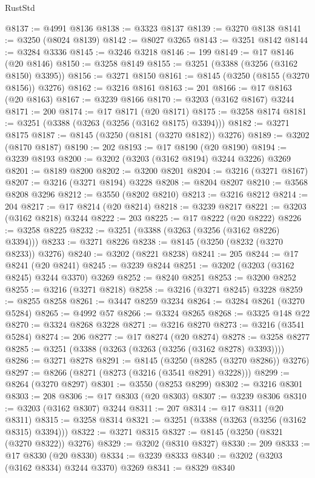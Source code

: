 \begin{lexlean}{RustStd}
\begin{coremodule}
@8137 := @4991 @8136
@8138 := @3323 @8137
@8139 := @3270 @8138
@8141 := @3250 (@8024 @8139)
@8142 := @8027 @3265
@8143 := @3251 @8142
@8144 := @3284 @3336
@8145 := @3246 @3218
@8146 := 199
@8149 := @17 @8146 (@20 @8146)
@8150 := @3258 @8149
@8155 := @3251 (@3388 (@3256 (@3162 @8150) @3395))
@8156 := @3271 @8150
@8161 := @8145 (@3250 (@8155 (@3270 @8156)) @3276)
@8162 := @3216 @8161
@8163 := 201
@8166 := @17 @8163 (@20 @8163)
@8167 := @3239 @8166
@8170 := @3203 (@3162 @8167) @3244
@8171 := 200
@8174 := @17 @8171 (@20 @8171)
@8175 := @3258 @8174
@8181 := @3251 (@3388 (@3263 (@3256 (@3162 @8175) @3394)))
@8182 := @3271 @8175
@8187 := @8145 (@3250 (@8181 (@3270 @8182)) @3276)
@8189 := @3202 (@8170 @8187)
@8190 := 202
@8193 := @17 @8190 (@20 @8190)
@8194 := @3239 @8193
@8200 := @3202 (@3203 (@3162 @8194) @3244 @3226) @3269
@8201 := @8189 @8200
@8202 := @3200 @8201
@8204 := @3216 (@3271 @8167)
@8207 := @3216 (@3271 @8194) @3228
@8208 := @8204 @8207
@8210 := @3568 @8208 @3296
@8212 := @3550 (@8202 @8210)
@8213 := @3216 @8212
@8214 := 204
@8217 := @17 @8214 (@20 @8214)
@8218 := @3239 @8217
@8221 := @3203 (@3162 @8218) @3244
@8222 := 203
@8225 := @17 @8222 (@20 @8222)
@8226 := @3258 @8225
@8232 := @3251 (@3388 (@3263 (@3256 (@3162 @8226) @3394)))
@8233 := @3271 @8226
@8238 := @8145 (@3250 (@8232 (@3270 @8233)) @3276)
@8240 := @3202 (@8221 @8238)
@8241 := 205
@8244 := @17 @8241 (@20 @8241)
@8245 := @3239 @8244
@8251 := @3202 (@3203 (@3162 @8245) @3244 @3370) @3269
@8252 := @8240 @8251
@8253 := @3200 @8252
@8255 := @3216 (@3271 @8218)
@8258 := @3216 (@3271 @8245) @3228
@8259 := @8255 @8258
@8261 := @3447 @8259 @3234
@8264 := @3284 @8261 (@3270 @5284)
@8265 := @4992 @57
@8266 := @3324 @8265
@8268 := @3325 @148 @22
@8270 := @3324 @8268 @3228
@8271 := @3216 @8270
@8273 := @3216 (@3541 @5284)
@8274 := 206
@8277 := @17 @8274 (@20 @8274)
@8278 := @3258 @8277
@8285 := @3251 (@3388 (@3263 (@3263 (@3256 (@3162 @8278) @3393))))
@8286 := @3271 @8278
@8291 := @8145 (@3250 (@8285 (@3270 @8286)) @3276)
@8297 := @8266 (@8271 (@8273 (@3216 (@3541 @8291) @3228)))
@8299 := @8264 (@3270 @8297)
@8301 := @3550 (@8253 @8299)
@8302 := @3216 @8301
@8303 := 208
@8306 := @17 @8303 (@20 @8303)
@8307 := @3239 @8306
@8310 := @3203 (@3162 @8307) @3244
@8311 := 207
@8314 := @17 @8311 (@20 @8311)
@8315 := @3258 @8314
@8321 := @3251 (@3388 (@3263 (@3256 (@3162 @8315) @3394)))
@8322 := @3271 @8315
@8327 := @8145 (@3250 (@8321 (@3270 @8322)) @3276)
@8329 := @3202 (@8310 @8327)
@8330 := 209
@8333 := @17 @8330 (@20 @8330)
@8334 := @3239 @8333
@8340 := @3202 (@3203 (@3162 @8334) @3244 @3370) @3269
@8341 := @8329 @8340

\end{coremodule}
\end{lexlean}
